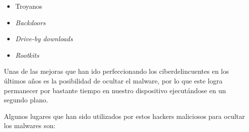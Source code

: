 \documentclass[12pt]{article}
\newcommand{\newpar} {
    \vskip 0.5cm
}
\begin{document}
            \begin{itemize}
                \item Troyanos
                \item \textit{Backdoors}
                \item \textit{Drive-by downloads}
                \item \textit{Rootkits}
            \end{itemize}

            \newpar

            Unas de las mejoras que han ido perfeccionando los ciberdelincuentes en los últimos años es la posibilidad de ocultar el malware, por lo que este logra permanecer por bastante tiempo en nuestro dispositivo ejecutándose en un segundo plano.

            \newpar

            Algunos lugares que han sido utilizados por estos hackers maliciosos para ocultar los malwares son:

\end{document}
